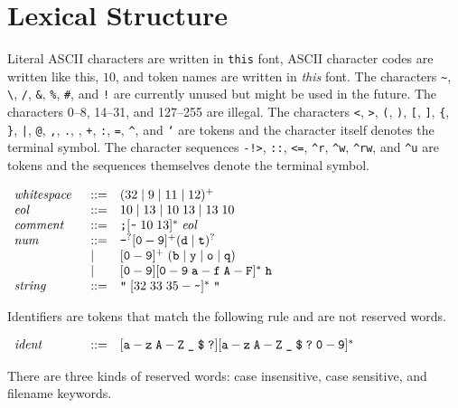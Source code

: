 \documentclass{article}
\newenvironment{gramrule}
  {\begin{flushleft}$\begin{array}{p{0.7in}ll}}
  {\end{array}$\end{flushleft}}
\newcommand{\term}[1]{{\it#1}}
\newcommand{\ts}[1]{\hbox{\tt#1}}
\newcommand{\alt}{\mathrel{|}}
\begin{document}
\section{Lexical Structure}
Literal ASCII characters are written in \ts{this} font, ASCII
character codes are written like this, $10$, and token names are
written in \term{this} font.  The characters \verb+~+, \verb+\+,
\ts{/}, \ts{\&}, \ts{\%}, \ts{\#}, and \ts{!}  are currently unused
but might be used in the future.  The characters 0--8, 14--31, and
127--255 are illegal.  The characters \ts{<}, \ts{>}, \ts{(}, \ts{)},
\ts{[}, \ts{]}, \verb+{+, \verb+}+, \ts{|}, \ts{@}, \ts{,}, \ts{.},
\ts{*}, \ts{+}, \ts{:}, \ts{=}, \verb+^+, and \ts{`} are tokens and the
character itself denotes the terminal symbol.  The character sequences
\ts{-!>}, \ts{::}, \ts{<=}, \verb+^r+, \verb+^w+, \verb+^rw+, and
\verb+^u+ are tokens and the sequences themselves denote the terminal
symbol.
\begin{gramrule}
\term{whitespace} &::=& (32 \alt 9 \alt 11 \alt 12)^+ \\
\term{eol} &::=& 10 \alt 13 \alt 10\;13 \alt 13\;10 \\
\term{comment} &::=& \ts{;} [\verb+~+\;10\;13]^* \; \term{eol} \\
\term{num} &::=& \ts{-}^? [\ts{0}-\ts{9}]^+(\ts{d} \alt \ts{t})^? \\
&|& [\ts{0}-\ts{9}]^+\;(\ts{b} \alt \ts{y} \alt \ts{o} \alt \ts{q}) \\
&|& [\ts{0}-\ts{9}][\ts{0}-\ts{9}\;\ts{a}-\ts{f}\;\ts{A}-\ts{F}]^*\;\ts{h} \\
\term{string} &::=& \ts{"} \; [32\;33\;35-\verb+~+]^* \; \ts{"}
\end{gramrule}
Identifiers are tokens that match the following rule and are not reserved
words.
\begin{gramrule}
\term{ident} &::=& [\ts{a}-\ts{z}\;\ts{A}-\ts{Z}\;\ts{\_}\;\ts{\$}\;\ts{?}]
[\ts{a}-\ts{z}\;\ts{A}-\ts{Z}\;\ts{\_}\;\ts{\$}\;\ts{?}\;\ts{0}-\ts{9}]^*
\end{gramrule}
There are three kinds of reserved words: case insensitive, case sensitive, and
filename keywords.
\end{document}
